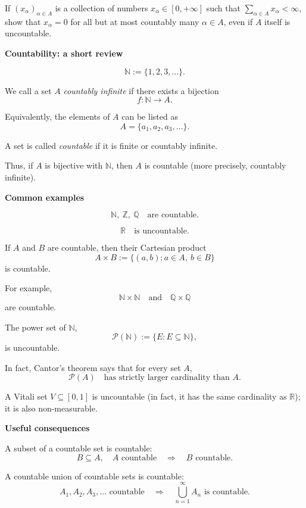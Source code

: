 \begin{exercise}
If \((x_\alpha)_{\alpha \in A}\) is a collection of numbers \(x_\alpha \in [0, +\infty]\)
 such that \(\sum_{\alpha \in A}x_\alpha < \infty\),
  show that \(x_\alpha=0\) for all but at most countably many
   \(\alpha \in A\), even if \(A\) itself is uncountable.
\end{exercise}

\textbf{Countability: a short review}

\[
\mathbb{N}:=\{1,2,3,\ldots\}.
\]

We call a set \(A\) \emph{countably infinite} if there exists a bijection
\[
f:\mathbb{N}\to A.
\]

Equivalently, the elements of \(A\) can be listed as
\[
A=\{a_1,a_2,a_3,\ldots\}.
\]

A set is called \emph{countable} if it is finite or countably infinite.

Thus, if \(A\) is bijective with \(\mathbb{N}\), then \(A\) is countable
(more precisely, countably infinite).

\medskip

\textbf{Common examples}

\[
\mathbb{N},\ \mathbb{Z},\ \mathbb{Q}
\quad\text{are countable.}
\]

\[
\mathbb{R}
\quad\text{is uncountable.}
\]

If \(A\) and \(B\) are countable, then their Cartesian product
\[
A\times B:=\{(a,b):a\in A,\ b\in B\}
\]
is countable.

For example,
\[
\mathbb{N}\times\mathbb{N}
\quad\text{and}\quad
\mathbb{Q}\times\mathbb{Q}
\]
are countable.

The power set of \(\mathbb{N}\),
\[
\mathcal{P}(\mathbb{N})
:=\{E:E\subseteq\mathbb{N}\},
\]
is uncountable.

In fact, Cantor's theorem says that for every set \(A\),
\[
\mathcal{P}(A)
\quad\text{has strictly larger cardinality than }A.
\]

A Vitali set \(V\subseteq[0,1]\) is uncountable
(in fact, it has the same cardinality as \(\mathbb{R}\));
it is also non-measurable.

\medskip

\textbf{Useful consequences}

A subset of a countable set is countable:
\[
B\subseteq A,\quad A\text{ countable}
\quad\Longrightarrow\quad
B\text{ countable}.
\]

A countable union of countable sets is countable:
\[
A_1,A_2,A_3,\ldots\text{ countable}
\quad\Longrightarrow\quad
\bigcup_{n=1}^{\infty} A_n
\text{ is countable}.
\]

